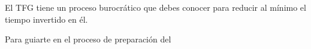 El TFG tiene un proceso burocrático que debes conocer para reducir al mínimo el tiempo invertido en él.


Para guiarte en el proceso de preparación del 





